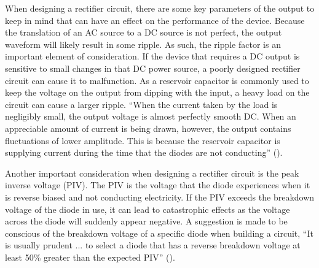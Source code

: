 When designing a rectifier circuit, there are some key
parameters of the output to keep in mind that can have
an effect on the performance of the device. Because
the translation of an AC source to a DC source is not
perfect, the output waveform will likely result in some
ripple. As such, the ripple factor is an important element
of consideration. If the device that requires a DC output
is sensitive to small changes in that DC power source,
a poorly designed rectifier circuit can cause it to
malfunction. As a reservoir capacitor is commonly used
to keep the voltage on the output from dipping with
the input, a heavy load on the circuit can cause a larger
ripple. ``When the current taken by the load is negligibly
small, the output voltage is almost perfectly smooth
DC. When an appreciable amount of current is being drawn,
however, the output contains fluctuations of lower amplitude.
This is because the reservoir capacitor is supplying
current during the time that the diodes are not conducting''
(\cite{sinclair1987electronics}).

Another important consideration when designing a rectifier
circuit is the peak inverse voltage (PIV). The PIV is
the voltage that the diode experiences when it is reverse
biased and not conducting electricity. If the PIV exceeds
the breakdown voltage of the diode in use, it can lead
to catastrophic effects as the voltage across the diode
will suddenly appear negative. A suggestion is made to be
conscious of the breakdown voltage of a specific diode when building
a circuit, ``It is usually prudent ... to select a diode
that has a reverse breakdown voltage at least 50\% greater than
the expected PIV'' (\cite{sedra2010microelectronic}).

